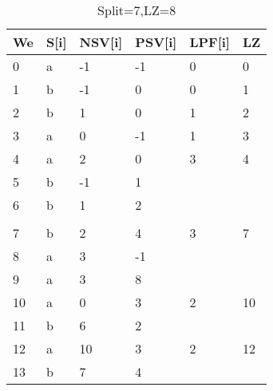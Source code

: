 \begin{table}[h]
\centering
\begin{tabular}{@{}llllll@{}}
\toprule
We  & S{[}i{]} & NSV{[}i{]} & PSV{[}i{]} & LPF{[}i{]} & LZ \\ \midrule
0  & a        & -1         & -1         & 0          & 0  \\
1  & b        & -1         & 0          & 0          & 1  \\
2  & b        & 1          & 0          & 1          & 2  \\
3  & a        & 0          & -1         & 1          & 3  \\
4  & a        & 2          & 0          & 3          & 4  \\
5  & b        & -1         & 1          &            &    \\
6  & b        & 1          & 2          &            &    \\
   &          &            &            &            &    \\
7  & b        & 2          & 4          & 3          & 7  \\
8  & a        & 3          & -1         &            &    \\
9  & a        & 3          & 8          &            &    \\
10 & a        & 0          & 3          & 2          & 10 \\
11 & b        & 6          & 2          &            &    \\
12 & a        & 10         & 3          & 2          & 12 \\
13 & b        & 7          & 4          &            &    \\ \bottomrule
\end{tabular}
\caption{Split=7,LZ=8}
\label{table:example7}
\end{table}

